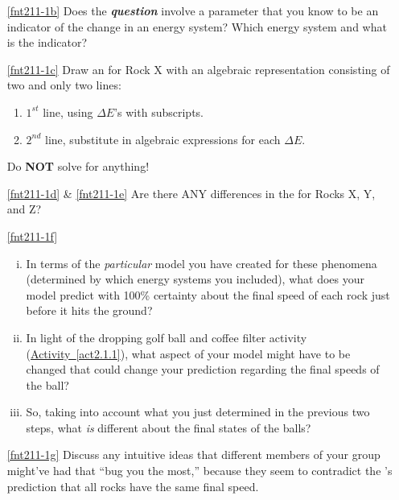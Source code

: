 \begin{enumerate}
	\item[\eqref{fnt211-1b}]	Does the \textbf{\em question} involve a parameter that you know to be an indicator of the change in an energy system?  Which energy system and what is the indicator?
	
	\item[\eqref{fnt211-1c}]	Draw an \EnergyDiagram{} for Rock X with an algebraic representation consisting of two and only two lines:
	\begin{enumerate}
		\item $1^{st}$ line, using $\Delta E$'s with subscripts.
		\item $2^{nd}$ line, substitute in algebraic expressions for each $\Delta E$.
	\end{enumerate}
	Do \textbf{NOT} solve for anything!
	
	\item[\eqref{fnt211-1d} \& \eqref{fnt211-1e}] Are there ANY differences in the \EnergyDiagrams{} for Rocks X, Y, and Z?
	
	\item[\eqref{fnt211-1f}] \begin{enumerate}[(i)]
		\item In terms of the {\em particular} model you have created for these phenomena (determined by which energy systems you included), what does your model predict with 100\% certainty about the final speed of each rock just before it hits the ground?
		\label{fnt211-1fi}
		
		\item In light of the dropping golf ball and coffee filter activity (\hyperref[act2.1.1]{Activity~\ref*{act2.1.1}}), what aspect of your model might have to be changed that could change your prediction regarding the final speeds of the ball?
		
		\item So, taking into account what you just determined in the previous two steps, what \emph{is} different about the final states of the balls?
	\end{enumerate}
	
	\item[\eqref{fnt211-1g}]	Discuss any intuitive ideas that different members of your group might've had that ``bug you the most,'' because they seem to contradict the \EnergyInteractionModel{}'s prediction that all rocks have the same final speed.
\end{enumerate}

